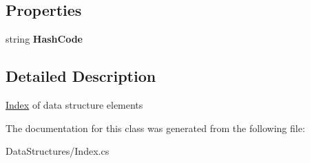 \subsection*{Properties}
\begin{DoxyCompactItemize}
\item 
\hypertarget{class_dwarf_d_b_1_1_data_structures_1_1_index_a610b62ec24e0fad773071dc6242eccfd}{string {\bfseries Hash\+Code}}\label{class_dwarf_d_b_1_1_data_structures_1_1_index_a610b62ec24e0fad773071dc6242eccfd}

\end{DoxyCompactItemize}


\subsection{Detailed Description}
\hyperlink{class_dwarf_d_b_1_1_data_structures_1_1_index}{Index} of data structure elements 



The documentation for this class was generated from the following file\+:\begin{DoxyCompactItemize}
\item 
Data\+Structures/Index.\+cs\end{DoxyCompactItemize}
